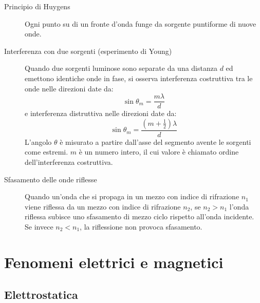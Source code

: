 \documentclass[a4paper,11pt,italian]{article}
\begin{document}
\begin{description}
  \item[Principio di Huygens] 
  Ogni punto su di un fronte d'onda funge da sorgente puntiforme di nuove onde.
  
  \item[Interferenza con due sorgenti (esperimento di Young)] 
  Quando due sorgenti luminose sono separate da una distanza $ d $ ed emettono identiche onde in fase, si osserva interferenza costruttiva tra le onde nelle direzioni date da:
  \[ \sin \theta_m = \frac{m\lambda}{d} \]
  e interferenza distruttiva nelle direzioni date da:
  \[ \sin \theta_m = \frac{(m + \frac{1}{2})\lambda}{d} \]
  L'angolo $ \theta $ è misurato a partire dall'asse del segmento avente le sorgenti come estremi. $ m $ è un numero intero, il cui valore è chiamato ordine dell'interferenza costruttiva.

  
  \item[Sfasamento delle onde riflesse] 
  Quando un'onda che si propaga in un mezzo con indice di rifrazione $ n_1 $ viene riflessa da un mezzo con indice di rifrazione $ n_2 $, se $ n_2 > n_1 $ l'onda riflessa subisce uno sfasamento di mezzo ciclo rispetto all'onda incidente. Se invece $ n_2 < n_1 $, la riflessione non provoca sfasamento.
\end{description}


\newpage
\section{Fenomeni elettrici e magnetici}

\subsection{Elettrostatica}
\end{document}
